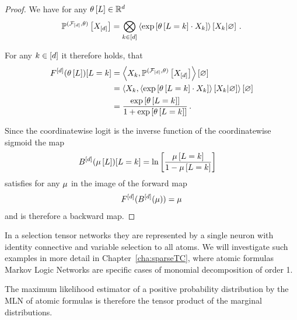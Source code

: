\begin{proof}
	We have for any $\theta\left[L\right]\in\mathbb{R}^{d}$
		\[ \mathbb{P}^{(\mathcal{F}_{[d]},\theta)}\left[X_{[d]}\right] 
		= \bigotimes_{k\in[d]} \left\langle \mathrm{exp}\left[\theta\left[L=k\right]\cdot X_{k}\right]\right\rangle \left[ X_{k} | \varnothing \right]  \, . \]

	
	For any $k\in[d]$ it therefore holds, that
	\begin{align*}
		F^{[d]}(\theta\left[L\right])[L=k] 
		&=\left\langle X_{k},  \mathbb{P}^{(\mathcal{F}_{[d]},\theta)}\left[X_{[d]}\right]\right\rangle \left[ \varnothing \right] \\
		&=\left\langle X_{k},  \left\langle \mathrm{exp}\left[\theta\left[L=k\right]\cdot X_{k}\right]\right\rangle \left[ X_{k} | \varnothing \right]\right\rangle \left[ \varnothing \right] \\
		& = \frac{\mathrm{exp}\left[\theta\left[L=k\right]\right]}{1+\mathrm{exp}\left[\theta\left[L=k\right]\right]} \, .
	\end{align*}

	Since the coordinatewise logit is the inverse function of the coordinatewise sigmoid the map
	\begin{align*}
		B^{[d]}(\mu\left[L\right])[L=k] 
		& = \ln \left[ \frac{\mu\left[L=k\right]}{1- \mu\left[L=k\right]} \right]
	\end{align*}
	satisfies for any $\mu$ in the image of the forward map
	\begin{align*}
		F^{[d]}(B^{[d]}(\mu)) = \mu 
	\end{align*}
	and is therefore a backward map.
\end{proof}


In a selection tensor networks they are represented by a single neuron with identity connective and variable selection to all atoms.
We will investigate such examples in more detail in Chapter~\ref{cha:sparseTC}, where atomic formulas Markov Logic Networks are specific cases of monomial decomposition of order 1.
	
The maximum likelihood estimator of a positive probability distribution by the MLN of atomic formulas is therefore the tensor product of the marginal distributions.

